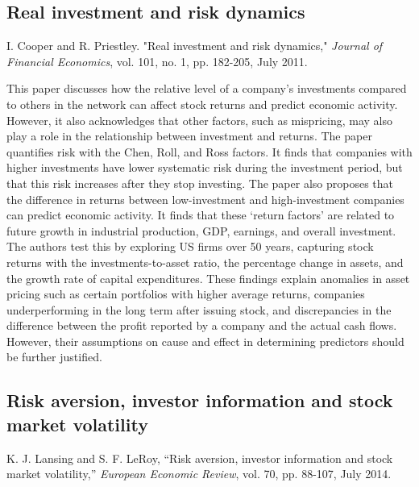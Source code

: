 \documentclass[12pt]{article}
\begin{document}
\subsection{Real investment and risk dynamics}
I. Cooper and R. Priestley. "Real investment and risk dynamics," \textit{Journal of Financial Economics}, vol. 101, no. 1, pp. 182-205, July 2011.
\newline

This paper discusses how the relative level of a company’s investments compared to others in the network can affect stock returns and predict economic activity. However, it also acknowledges that other factors, such as mispricing, may also play a role in the relationship between investment and returns. 
The paper quantifies risk with the Chen, Roll, and Ross factors. It finds that companies with higher investments have lower systematic risk during the investment period, but that this risk increases after they stop investing.
The paper also proposes that the difference in returns between low-investment and high-investment companies can predict economic activity. It finds that these ‘return factors’ are related to future growth in industrial production, GDP, earnings, and overall investment.
The authors test this by exploring US firms over 50 years, capturing stock returns with the investments-to-asset ratio, the percentage change in assets, and the growth rate of capital expenditures. 
These findings explain anomalies in asset pricing such as certain portfolios with higher average returns, companies underperforming in the long term after issuing stock, and discrepancies in the difference between the profit reported by a company and the actual cash flows. However, their assumptions on cause and effect in determining predictors should be further justified.


\subsection{Risk aversion, investor information and stock market volatility}
K. J. Lansing and S. F. LeRoy, “Risk aversion, investor information and stock market volatility,” \textit{European Economic Review}, vol. 70, pp. 88-107, July 2014. 
\newline
\end{document}
